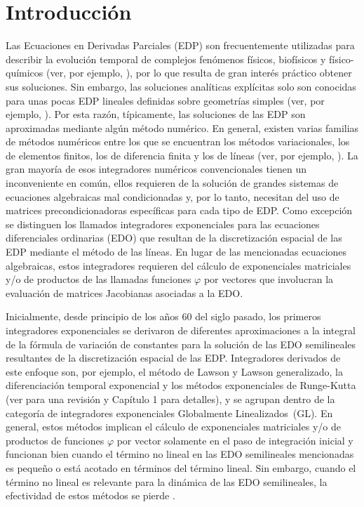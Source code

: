 \chapter*{Introducción}\label{chapter:introduction}

Las Ecuaciones en Derivadas Parciales (EDP) son frecuentemente utilizadas para describir la evolución temporal de complejos fenómenos físicos, biofísicos y físico-químicos (ver, por ejemplo, \cite{tikhonov2013,gray1990,cronin1987}), por lo que resulta de gran interés práctico obtener sus soluciones. Sin embargo, las soluciones analíticas explícitas solo son conocidas para unas pocas EDP lineales definidas sobre geometrías simples (ver, por ejemplo, \cite{tikhonov2013}). Por esta razón, típicamente, las soluciones de las EDP son aproximadas mediante algún método numérico. En general, existen varias familias de métodos numéricos entre los que se encuentran los métodos variacionales, los de elementos finitos, los de diferencia finita y los de líneas (ver, por ejemplo, \cite{prenter2008,samarskii2008,schiesser2012}). La gran mayoría de esos integradores numéricos convencionales tienen un inconveniente en común, ellos requieren de la solución de grandes sistemas de ecuaciones algebraicas mal condicionadas y, por lo tanto, necesitan del uso de matrices precondicionadoras específicas para cada tipo de EDP. Como excepción se distinguen los llamados integradores exponenciales para las ecuaciones diferenciales ordinarias (EDO) que resultan de la discretización espacial de las EDP mediante el método de las líneas. En lugar de las mencionadas ecuaciones algebraicas, estos integradores requieren del cálculo de exponenciales matriciales y/o de productos de las llamadas funciones $\varphi$ por vectores que involucran la evaluación de matrices Jacobianas asociadas a la EDO.

Inicialmente, desde principio de los años 60 del siglo pasado, los primeros  integradores exponenciales se derivaron de diferentes aproximaciones a la integral de la fórmula de variación de constantes para la solución de las EDO semilineales resultantes de la discretización espacial de las EDP. Integradores derivados de este enfoque son, por ejemplo, el método de Lawson y Lawson generalizado, la diferenciación temporal exponencial y los métodos exponenciales de Runge-Kutta (ver \cite{Berland07} para una revisión y Capítulo 1 para detalles), y se agrupan dentro de la categoría de integradores exponenciales Globalmente Linealizados~(GL). En general, estos métodos implican el cálculo de exponenciales matriciales y/o de productos de funciones $\varphi$ por vector solamente en el paso de integración inicial y funcionan bien cuando el término no lineal en las EDO semilineales mencionadas es pequeño o está acotado en términos del término lineal. Sin embargo, cuando el término no lineal es relevante para la dinámica de las EDO semilineales, la efectividad de estos métodos se pierde \cite{hochbruck2009exponential}.


